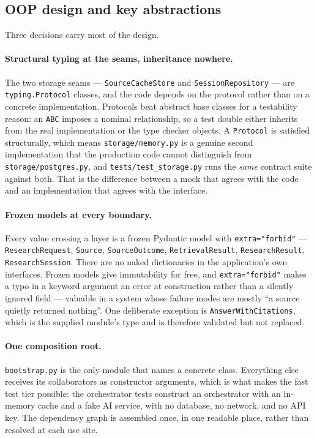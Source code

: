 \documentclass[10pt,a4paper]{article}
\begin{document}
\subsection{OOP design and key abstractions}
\label{sec:oop}

Three decisions carry most of the design.

\paragraph{Structural typing at the seams, inheritance nowhere.} The two storage seams ---
\texttt{SourceCacheStore} and \texttt{SessionRepository} --- are \texttt{typing.Protocol}
classes, and the code depends on the protocol rather than on a concrete implementation. Protocols beat
abstract base classes for a testability reason: an
\texttt{ABC} imposes a nominal relationship, so a test double either inherits from the real
implementation or the type checker objects. A \texttt{Protocol} is satisfied structurally, which
means \texttt{storage/memory.py} is a genuine second implementation that the production code
cannot distinguish from \texttt{storage/postgres.py}, and \texttt{tests/test\_storage.py} runs
the \emph{same} contract suite against both. That is the difference between a mock that agrees
with the code and an implementation that agrees with the interface.

\paragraph{Frozen models at every boundary.} Every value crossing a layer is a frozen Pydantic
model with \texttt{extra="forbid"} --- \texttt{ResearchRequest}, \texttt{Source},
\texttt{SourceOutcome}, \texttt{RetrievalResult}, \texttt{ResearchResult},
\texttt{ResearchSession}. There are no naked dictionaries in the application's own interfaces.
Frozen models give immutability for free, and \texttt{extra="forbid"} makes a typo in a
keyword argument an error at construction rather than a silently ignored field --- valuable in a
system whose failure modes are mostly ``a source quietly returned nothing''. One deliberate exception is \texttt{AnswerWithCitations}, which is the supplied module's
type and is therefore validated but not replaced.

\paragraph{One composition root.} \texttt{bootstrap.py} is the only module that names a concrete
class. Everything else receives its collaborators as constructor arguments, which is what makes
the fast test tier possible: the orchestrator tests construct an orchestrator with an in-memory
cache and a fake AI service, with no database, no network, and no API key. The dependency graph
is assembled once, in one readable place, rather than resolved at each use site.
\end{document}
